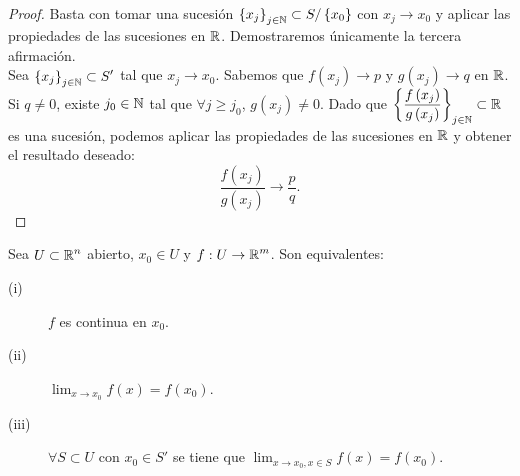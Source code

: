 \begin{proof}
	Basta con tomar una sucesión $\displaystyle \left\{ x_{j}\right\} _{j \in \mathbb{N}} \subset S / \left\{ x_{0}\right\} $ con $\displaystyle x_{j} \to x_{0} $ y aplicar las propiedades de las sucesiones en $\displaystyle \mathbb{R} $. Demostraremos únicamente la tercera afirmación. \\
 Sea $\displaystyle \left\{ x_{j}\right\} _{j\in \mathbb{N}}\subset S' $ tal que $\displaystyle x_{j} \to x_{0} $. Sabemos que $\displaystyle f\left(x_{j}\right) \to p $ y $\displaystyle g\left(x_{j}\right) \to q $ en $\displaystyle \mathbb{R} $. Si $\displaystyle q \neq 0 $, existe $\displaystyle j_{0} \in \mathbb{N} $ tal que $\displaystyle \forall j \geq j_{0} $, $\displaystyle g\left(x_{j}\right) \neq 0 $. 
 Dado que $\displaystyle \left\{ \frac{f\left(x_{j}\right)}{g\left(x_{j}\right)}\right\} _{j \in \mathbb{N}} \subset \mathbb{R} $ es una sucesión, podemos aplicar las propiedades de las sucesiones en $\displaystyle \mathbb{R} $ y obtener el resultado deseado: 
 \[ \frac{f\left(x_{j}\right)}{g\left(x_{j}\right)} \to \frac{p}{q} .\]
\end{proof}
\begin{prop}
Sea $\displaystyle U \subset \mathbb{R}^{n} $ abierto, $\displaystyle x_{0} \in U $ y $\displaystyle f : U \to \mathbb{R}^{m} $. Son equivalentes:
\begin{description}
\item[(i)] $\displaystyle f $ es continua en $\displaystyle x_{0} $.
\item[(ii)] $\displaystyle \lim_{x \to x_{0}}f\left(x\right) = f\left(x_{0}\right) $.
\item[(iii)] $\displaystyle \forall S \subset U $ con $\displaystyle x_{0} \in S' $ se tiene que $\displaystyle \lim_{x \to x_{0}, x \in S}f\left(x\right) = f\left(x_{0}\right) $.
\end{description}
\end{prop}
